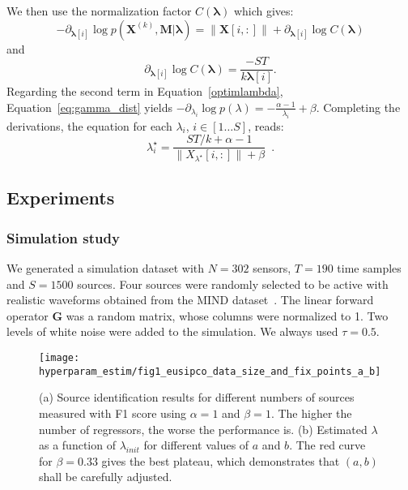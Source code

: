 We then use the normalization factor $C(\mathbf{\lambda})$ which gives:\\
\begin{equation}
 - \partial_{\mathbf{\lambda}[i]} \log p(\mathbf{X}^{(k)}, \mathbf{M}|\mathbf{\lambda})=\|\mathbf{X}[i,:]\| + \partial_{\mathbf{\lambda}[i]} \log C(\mathbf{\lambda})
\end{equation}
 and 
\begin{equation} 
 \partial_{\mathbf{\lambda}[i]} \log C(\mathbf{\lambda})=\frac{-ST}{k\mathbf{\lambda}[i]}.
\end{equation}
  Regarding the second term in Equation~\eqref{optimlambda}, Equation~\eqref{eq:gamma_dist} yields $-\partial_{\lambda_i} \log p(\lambda) = -\frac{\alpha-1}{\lambda_i} + \beta$.
Completing the derivations, the equation for each $\lambda_i$, $i\in[1\dots S]$, reads:
\begin{equation} \label{eq9}
\lambda^\star_i=\frac{ST/k + \alpha - 1}{\|X_{\lambda^\star}[i,:]\| + \beta} \enspace .
\end{equation}

\subsection{Experiments}
\subsubsection{Simulation study}

We generated a simulation dataset with $N=302$ sensors, $T=190$ time samples and $S=1500$ sources. Four sources were randomly selected to be active with realistic waveforms obtained from the MIND dataset~\cite{weisend2007paving}. The linear forward operator $\mathbf{G}$ was a random matrix, whose columns were normalized to 1. Two levels of white noise were added to the simulation. We always used $\tau=0.5$.

\begin{figure}
	\texttt{[image: hyperparam\_estim/fig1\_eusipco\_data\_size\_and\_fix\_points\_a\_b]}
    \caption{(a) Source identification results for different numbers of sources measured with F1 score using $\alpha=1$ and $\beta=1$. The higher the number of regressors, the worse the performance is. (b) Estimated $\lambda$ as a function of $\lambda_{init}$ for different values of $a$ and $b$. The red curve for $\beta=0.33$ gives the best plateau, which demonstrates that $(a,b)$ shall be carefully adjusted.}
    \label{fig:fig1_eusipco}
\end{figure}

